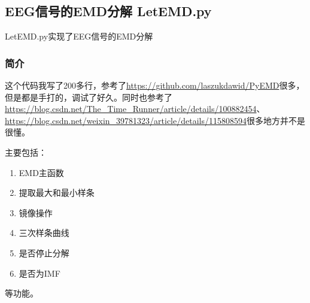 \documentclass[cs4size,a4paper]{ctexart}
\numberwithin{equation}{section}
\numberwithin{table}{section}
\numberwithin{figure}{section}
\begin{document}
\subsection{EEG信号的EMD分解 LetEMD.py}

\colorbox{LetMeFlyGray}{LetEMD.py}实现了EEG信号的EMD分解

\subsubsection{简介}

这个代码我写了200多行，参考了\url{https://github.com/laszukdawid/PyEMD}很多，但是都是手打的，调试了好久。同时也参考了\url{https://blog.csdn.net/The_Time_Runner/article/details/100882454}、\url{https://blog.csdn.net/weixin_39781323/article/details/115808594}很多地方并不是很懂。

主要包括：

\begin{enumerate}
    \item EMD主函数
    \item 提取最大和最小样条
    \item 镜像操作
    \item 三次样条曲线
    \item 是否停止分解
    \item 是否为IMF
\end{enumerate}

等功能。
\end{document}
